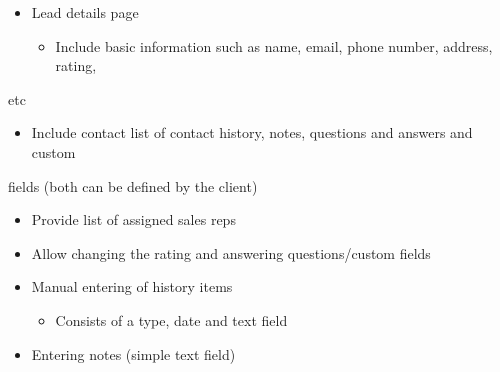 \documentclass[11pt,a4paper]{article}
\begin{document}
\begin{itemize}
\item Lead details page
\begin{itemize}
\item Include basic information such as name, email, phone number, address, rating,
\end{itemize}
\end{itemize}
etc

\begin{itemize}
\item Include contact list of contact history, notes, questions and answers and custom
\end{itemize}
fields (both can be defined by the client)

\begin{itemize}
\item Provide list of assigned sales reps
\item Allow changing the rating and answering questions/custom fields
\end{itemize}
\begin{itemize}
\item Manual entering of history items
\begin{itemize}
\item Consists of a type, date and text field
\end{itemize}
\item Entering notes (simple text field)
\end{itemize}
\end{document}
